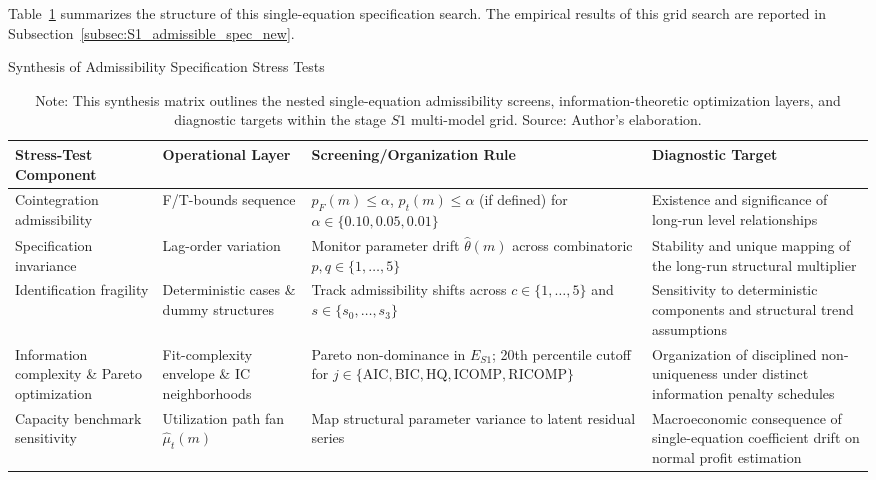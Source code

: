 Table~\ref{tab:s1_stress_synthesis} summarizes the structure of this single-equation specification search. The empirical results of this grid search are reported in Subsection~\ref{subsec:S1_admissible_spec_new}.

\begin{table}[h!]
\centering
\small
\caption{Synthesis of Admissibility Specification Stress Tests}
\label{tab:s1_stress_synthesis}
\begin{tabular}{@{}>{\raggedright\arraybackslash}p{3.2cm}>{\raggedright\arraybackslash}p{2.6cm}>{\raggedright\arraybackslash}p{3.8cm}>{\raggedright\arraybackslash}p{4.0cm}@{}}
\toprule
\toprule
Stress-Test Component & Operational Layer & Screening/Organization Rule & Diagnostic Target \\
\midrule
\midrule
Cointegration admissibility & F/T-bounds sequence & $p_F(m) \leq \alpha$, $p_t(m) \leq \alpha$ (if defined) for $\alpha \in \{0.10, 0.05, 0.01\}$ & Existence and significance of long-run level relationships \\
Specification invariance & Lag-order variation & Monitor parameter drift $\hat{\theta}(m)$ across combinatoric $p,q \in \{1,\dots,5\}$ & Stability and unique mapping of the long-run structural multiplier \\
Identification fragility & Deterministic cases \& dummy structures & Track admissibility shifts across $c \in \{1,\dots,5\}$ and $s \in \{s_0,\dots,s_3\}$ & Sensitivity to deterministic components and structural trend assumptions \\
Information complexity \& Pareto optimization & Fit-complexity envelope \& IC neighborhoods & Pareto non-dominance in $E_{S1}$; 20th percentile cutoff for $j \in \{\text{AIC}, \text{BIC}, \text{HQ}, \text{ICOMP}, \text{RICOMP}\}$ & Organization of disciplined non-uniqueness under distinct information penalty schedules \\
Capacity benchmark sensitivity & Utilization path fan $\hat{\mu}_t(m)$ & Map structural parameter variance to latent residual series & Macroeconomic consequence of single-equation coefficient drift on normal profit estimation \\
\bottomrule
\end{tabular}
\caption*{\footnotesize Note: This synthesis matrix outlines the nested single-equation admissibility screens, information-theoretic optimization layers, and diagnostic targets within the stage $S1$ multi-model grid. Source: Author's elaboration.}
\end{table}

